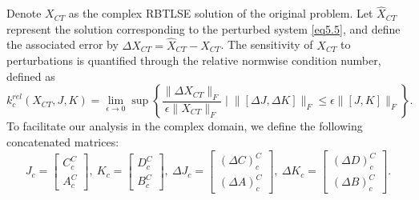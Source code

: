 \documentclass[preprint,11pt,3p]{elsarticle}
\begin{document}
Denote $X_{CT}$ as the complex RBTLSE solution of the original problem. Let $\widehat{X}_{CT}$ represent the solution corresponding to the perturbed system \eqref{eq5.5}, and define the associated error by $\Delta X_{CT} = \widehat{X}_{CT} - X_{CT}$. The sensitivity of $X_{CT}$ to perturbations is quantified through the relative normwise condition number, defined as
\begin{equation}\label{eq5.11}
	\mathit{k}^{rel}_c(X_{CT}, J, K) = \lim \limits_{\epsilon \rightarrow 0} \sup \left\{\frac{\|\Delta X_{CT}\|_F}{\epsilon \|X_{CT}\|_F} \; | \; \|[\Delta J, \Delta K]\|_F \leq \epsilon \|[J, K]\|_F\right\}.
\end{equation} 
To facilitate our analysis in the complex domain, we define the following concatenated matrices:
\begin{equation}\label{eq5.12}
	J_c = \begin{bmatrix}
		C^C_c \\
		A^C_c
	\end{bmatrix}, ~ K_c = \begin{bmatrix}
		D^C_c \\
		B^C_c
	\end{bmatrix}, ~ \Delta J_c = \begin{bmatrix}
	(\Delta C)^C_c \\
	(\Delta A)^C_c
\end{bmatrix}, ~ \Delta K_c = \begin{bmatrix}
(\Delta D)^C_c \\
(\Delta B)^C_c
\end{bmatrix}.
\end{equation}
\end{document}

